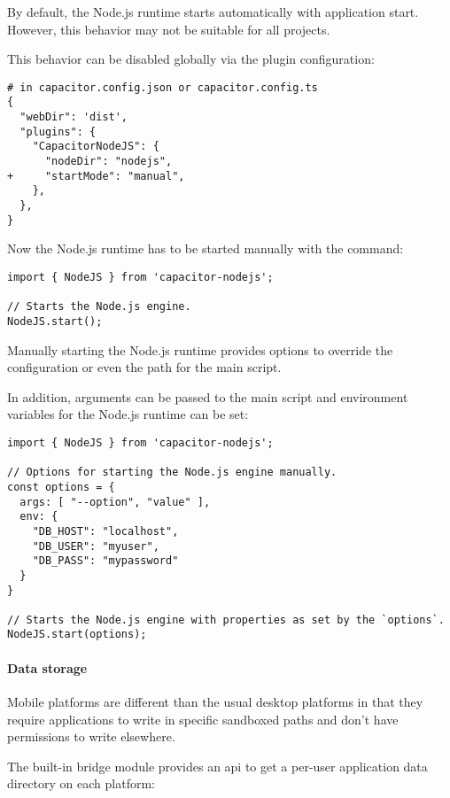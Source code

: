 By default, the Node.js runtime starts automatically with application start.
However, this behavior may not be suitable for all projects. 

This behavior can be disabled globally via the  plugin configuration:

\begin{verbatim}
# in capacitor.config.json or capacitor.config.ts
{
  "webDir": 'dist',
  "plugins": {
    "CapacitorNodeJS": {
      "nodeDir": "nodejs",
+     "startMode": "manual",
    },
  },
} 
\end{verbatim}

Now the Node.js runtime has to be started manually with the  command:

\begin{verbatim}
import { NodeJS } from 'capacitor-nodejs';

// Starts the Node.js engine.
NodeJS.start();
\end{verbatim}

Manually starting the Node.js runtime provides options to override the  configuration or even the path for the main script.

In addition, arguments can be passed to the main script and environment variables for the Node.js runtime can be set:

\begin{verbatim}
import { NodeJS } from 'capacitor-nodejs';

// Options for starting the Node.js engine manually.
const options = {
  args: [ "--option", "value" ],
  env: {
    "DB_HOST": "localhost",
    "DB_USER": "myuser",
    "DB_PASS": "mypassword"
  }
}

// Starts the Node.js engine with properties as set by the `options`.
NodeJS.start(options);
\end{verbatim}

\newpage

\paragraph{Data storage}
\label{sec:Capacitor-NodeJS:DataStorage}

Mobile platforms are different than the usual desktop platforms in that they require applications to write in specific sandboxed paths and don't have permissions to write elsewhere.
\cite{nodejs-mobile:docs}

The built-in bridge module provides an \ac{api} to get a per-user application data directory on each platform:

